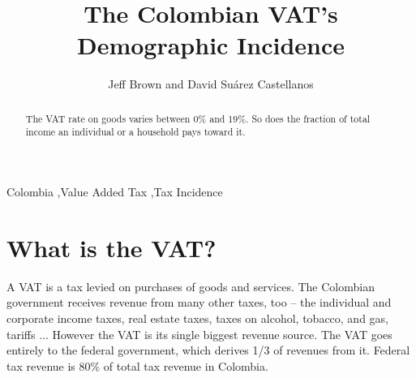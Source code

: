 \documentclass[preprint,12pt]{elsarticle}
\begin{document}
\begin{frontmatter}


\title{The Colombian VAT's Demographic Incidence}




\author{Jeff Brown and David Suárez Castellanos}

\address{Bogotá, Colombia}

\begin{abstract}
The VAT rate on goods varies between 0\% and 19\%. So does the fraction of total income an individual or a household pays toward it.
\end{abstract}

\begin{keyword}
Colombia \sep Value Added Tax \sep Tax Incidence
\end{keyword}

\end{frontmatter}


\section{What is the VAT?}

A VAT is a tax levied on purchases of goods and services. The Colombian government receives revenue from many other taxes, too -- the individual and corporate income taxes, real estate taxes, taxes on alcohol, tobacco, and gas, tariffs ... However the VAT is its single biggest revenue source. The VAT goes entirely to the federal government, which derives 1/3 of revenues from it. Federal tax revenue is 80\% of total tax revenue in Colombia.
\\
\end{document}
